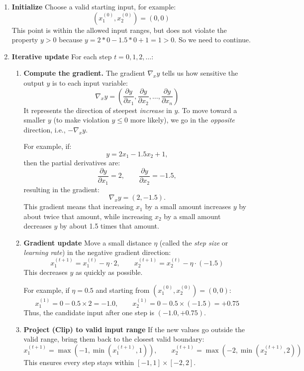 \documentclass[oneside,11pt,dvipsnames]{book}
\numberwithin{equation}{section}
\theoremstyle{definition}
\theoremstyle{remark}
\begin{document}
\begin{enumerate}
    \item \textbf{Initialize}
    Choose a valid starting input, for example:
    \[
    (x_1^{(0)}, x_2^{(0)}) = (0, 0)
    \]
    This point is within the allowed input ranges, but does not violate the property $y > 0$ because $y = 2*0-1.5*0 + 1 = 1 > 0$. So we need to continue.

    \item \textbf{Iterative update}
    For each step $t = 0, 1, 2, \ldots$:
    \begin{enumerate}
        \item \textbf{Compute the gradient.}
        The gradient $\nabla_x y$ tells us how sensitive the output $y$ is to each input variable:
        \[
        \nabla_x y = \left( \frac{\partial y}{\partial x_1}, \frac{\partial y}{\partial x_2}, \ldots, \frac{\partial y}{\partial x_n} \right)
        \]
        It represents the direction of steepest \emph{increase} in $y$.
        To move toward a smaller $y$ (to make violation $y \le 0$ more likely), we go in the \emph{opposite} direction, i.e., $-\nabla_x y$.

        For example, if:
        \[
        y = 2x_1 - 1.5x_2 + 1,
        \]
        then the partial derivatives are:
        \[
        \frac{\partial y}{\partial x_1} = 2, \qquad
        \frac{\partial y}{\partial x_2} = -1.5,
        \]
        resulting in the gradient:
        \[
        \nabla_x y = (2, -1.5).
        \]
        This gradient means that increasing $x_1$ by a small amount increases $y$ by about twice that amount, while increasing $x_2$ by a small amount decreases $y$ by about 1.5 times that amount.



        \item \textbf{Gradient update}
        Move a small distance $\eta$ (called the \emph{step size} or \emph{learning rate}) in the negative gradient direction:
        \[
        x_1^{(t+1)} = x_1^{(t)} - \eta \cdot 2, \qquad
        x_2^{(t+1)} = x_2^{(t)} - \eta \cdot (-1.5)
        \]
        This decreases $y$ as quickly as possible.

        For example, if $\eta = 0.5$ and starting from $(x_1^{(0)}, x_2^{(0)}) = (0, 0)$:
        \[
        x_1^{(1)} = 0 - 0.5 \times 2 = -1.0, \qquad
        x_2^{(1)}   = 0 - 0.5 \times (-1.5) = +0.75
        \]
        Thus, the candidate input after one step is $(-1.0, +0.75)$.

        \item \textbf{Project (Clip) to valid input range}
        If the new values go outside the valid range, bring them back to the closest valid boundary:
        \[
        x_1^{(t+1)} = \max(-1, \min(x_1^{(t+1)}, 1)), \qquad
        x_2^{(t+1)} = \max(-2, \min(x_2^{(t+1)}, 2))
        \]
        This ensures every step stays within $[-1, 1] \times [-2, 2]$.


\end{enumerate}
\end{enumerate}
\end{document}
